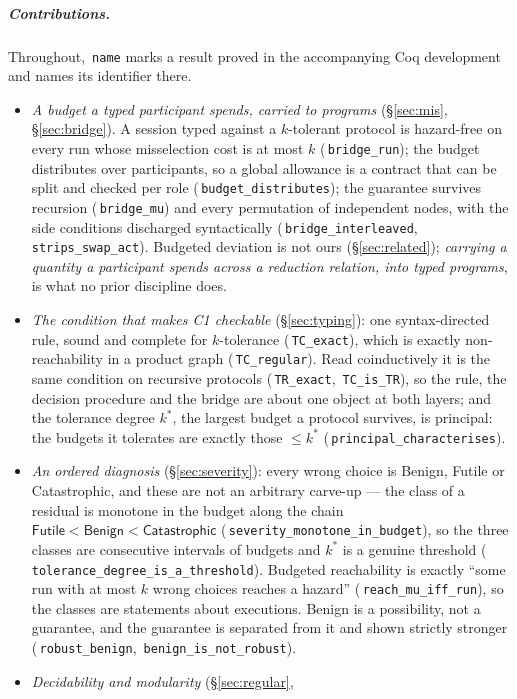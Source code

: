 \documentclass[a4paper,UKenglish,cleveref,autoref,thm-restate,anonymous]{lipics-v2021}
\newcommand{\Ben}{\textsf{Benign}}
\newcommand{\Fut}{\textsf{Futile}}
\newcommand{\Cat}{\textsf{Catastrophic}}
\newcommand{\coqok}[1]{\textcolor{okgreen}{\ding{51}}\,\texttt{\small #1}}
\newcommand{\kstar}{k^{*}}
\begin{document}
\subparagraph*{Contributions.}
Throughout, \coqok{name} marks a result proved in the accompanying Coq
development and names its identifier there.
\begin{itemize}
\item[\textbf{C1}] \emph{A budget a typed participant spends, carried to
  programs} (\S\ref{sec:mis}, \S\ref{sec:bridge}). A session typed against a
  $k$-tolerant protocol is hazard-free on every run whose misselection cost is
  at most $k$ (\coqok{bridge\_run}); the budget distributes over participants,
  so a global allowance is a contract that can be split and checked per role
  (\coqok{budget\_distributes}); the guarantee survives recursion
  (\coqok{bridge\_mu}) and every permutation of independent nodes, with the
  side conditions discharged syntactically (\coqok{bridge\_interleaved},
  \coqok{strips\_swap\_act}). Budgeted deviation is not ours
  (\S\ref{sec:related}); \emph{carrying a quantity a participant spends
  across a reduction relation, into typed programs}, is what no prior
  discipline does.
\item[\textbf{C2}] \emph{The condition that makes C1 checkable}
  (\S\ref{sec:typing}): one syntax-directed rule, sound and complete for
  $k$-tolerance (\coqok{TC\_exact}), which is exactly non-reachability in a
  product graph (\coqok{TC\_regular}). Read coinductively it is the same
  condition on recursive protocols (\coqok{TR\_exact}, \coqok{TC\_is\_TR}), so
  the rule, the decision procedure and the bridge are about one object at both
  layers; and the tolerance degree $\kstar$, the largest budget a protocol
  survives, is principal: the budgets it tolerates are exactly those
  $\le\kstar$ (\coqok{principal\_characterises}).
\item[\textbf{C3}] \emph{An ordered diagnosis} (\S\ref{sec:severity}): every
  wrong choice is \Ben, \Fut{} or \Cat, and these are not an arbitrary carve-up
  --- the class of a residual is monotone in the budget along the chain
  $\Fut<\Ben<\Cat$ (\coqok{severity\_monotone\_in\_budget}), so the three
  classes are consecutive intervals of budgets and $\kstar$ is a genuine
  threshold (\coqok{tolerance\_degree\_is\_a\_threshold}). Budgeted
  reachability is exactly ``some run with at most $k$ wrong choices reaches a
  hazard'' (\coqok{reach\_mu\_iff\_run}), so the classes are statements about
  executions. \Ben{} is a possibility, not a guarantee, and the guarantee is
  separated from it and shown strictly stronger (\coqok{robust\_benign},
  \coqok{benign\_is\_not\_robust}).
\item[\textbf{C4}] \emph{Decidability and modularity} (\S\ref{sec:regular},

\end{itemize}
\end{document}

